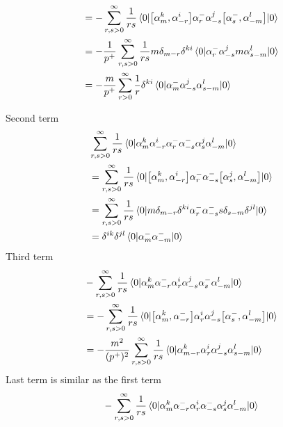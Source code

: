 \begin{enumerate}[label=(\alph*)]
\begin{itemize}
\begin{align*}
																							  &=  -\sum_{r,s>0}^{\infty} \frac{1}{rs}  \braket{0 | \comm{\alpha^k_m}{\alpha^i_{-r}} \alpha^-_r \alpha^j_{-s} \comm{\alpha^-_s}{\alpha^l_{-m}} | 0} \\
																							  &=  -\frac{1}{p^+} \sum_{r,s>0}^{\infty} \frac{1}{rs} m \delta_{m-r} \delta^{ki}\braket{0 | \alpha^-_r \alpha^j_{-s}  m \alpha^{l}_{s-m} | 0} \\
																							  &=  -\frac{m}{p^+} \sum_{r>0}^{\infty} \frac{1}{r}  \delta^{ki}\braket{0 | \alpha^-_m \alpha^j_{-s} \alpha^l_{s-m} | 0} \\
					\end{align*}

					Second term
					\begin{align*}
																							  & \sum_{r,s>0}^{\infty} \frac{1}{rs}  \braket{0 | \alpha^k_m \alpha^i_{-r} \alpha^-_r  \alpha^-_{-s} \alpha^{j}_s \alpha^l_{-m} | 0} \\
																							  &= \sum_{r,s>0}^{\infty} \frac{1}{rs}  \braket{0 | \comm{\alpha^k_m}{\alpha^i_{-r}} \alpha^-_r  \alpha^-_{-s} \comm{\alpha^{j}_s}{\alpha^l_{-m}} | 0} \\
																							  &= \sum_{r,s>0}^{\infty} \frac{1}{rs}  \braket{0 | m \delta_{m-r} \delta^{ki} \alpha^-_r  \alpha^-_{-s} s \delta_{s-m} \delta^{jl} | 0} \\
																							  &= \delta^{ik} \delta^{jl} \braket{0| \alpha^-_m \alpha^-_{-m} | 0}
				\end{align*}
				Third term
				\begin{align*}
																							  &  -\sum_{r,s>0}^{\infty} \frac{1}{rs}  \braket{0 |\alpha^k_m \alpha^-_{-r} \alpha^i_r \alpha^j_{-s} \alpha^-_{s}   \alpha^l_{-m} | 0} \\
																							  &=  -\sum_{r,s>0}^{\infty} \frac{1}{rs}  \braket{0 |\comm{\alpha^k_m}{\alpha^-_{-r}} \alpha^i_r \alpha^j_{-s} \comm{\alpha^-_{s}}{ \alpha^l_{-m}} | 0} \\
																							  &=  -\frac{m^2}{(p^+)^2} \sum_{r,s>0}^{\infty} \frac{1}{rs}  \braket{0 |\alpha^k_{m-r} \alpha^i_r \alpha^j_{-s} \alpha^l_{s-m} | 0} \\
				\end{align*}
				Last term is similar as the first term
				\begin{align*}
																							  &  -\sum_{r,s>0}^{\infty} \frac{1}{rs}  \braket{0 |\alpha^k_m  \alpha^-_{-r} \alpha^i_r \alpha^-_{-s} \alpha^j_s  \alpha^l_{-m} | 0} \\

\end{align*}
\end{itemize}
\end{enumerate}
